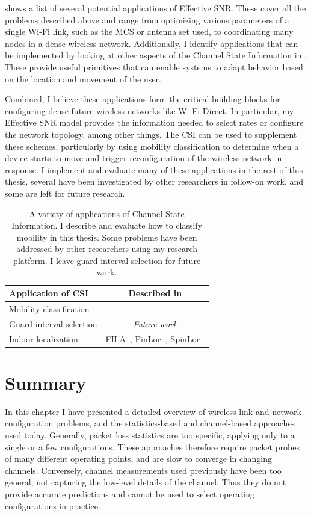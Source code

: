  shows a list of several potential applications of Effective SNR. These cover all the problems described above and range from optimizing various parameters of a single Wi-Fi link, such as the MCS or antenna set used, to coordinating many nodes in a dense wireless network. Additionally, I identify applications that can be implemented by looking at other aspects of the Channel State Information in . These provide useful primitives that can enable systems to adapt behavior based on the location and movement of the user.

Combined, I believe these applications form the critical building blocks for configuring dense future wireless networks like Wi-Fi Direct. In particular, my Effective SNR model provides the information needed to select rates or configure the network topology, among other things. The CSI can be used to supplement these schemes, particularly by using mobility classification to determine when a device starts to move and trigger reconfiguration of the wireless network in response. I implement and evaluate many of these applications in the rest of this thesis, several have been investigated by other researchers in follow-on work, and some are left for future research.

\begin{table}[tp]
	\centering
	\begin{tabular}{lc}
	\toprule
		Application of CSI & Described in \\
	\midrule
		Mobility classification & \chapref{chap:applications}\\
	    Guard interval selection & \emph{Future work}\\
		Indoor localization & FILA~\cite{Wu_FILA}, PinLoc~\cite{Sen_PinLoc}, SpinLoc~\cite{Sen_SpinLoc} \\ 
	\bottomrule
	\end{tabular}
	\caption[A variety of applications of Channel State Information]{\label{tab:csi_uses}A variety of applications of Channel State Information. I describe and evaluate how to classify mobility in this thesis. Some problems have been addressed by other researchers using my research platform. I leave guard interval selection for future work.}
\end{table}

\section{Summary}
In this chapter I have presented a detailed overview of wireless link and network configuration problems, and the statistics-based and channel-based approaches used today. Generally, packet loss statistics are too specific, applying only to a single or a few configurations. These approaches therefore require packet probes of many different operating points, and are slow to converge in changing channels. Conversely, channel measurements used previously have been too general, not capturing the low-level details of the channel. Thus they do not provide accurate predictions and cannot be used to select operating configurations in practice.

